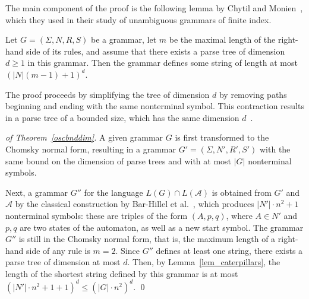 \documentclass[runningheads]{llncs}
\begin{document}
The main component of the proof
is the following lemma by Chytil and Monien~\cite{ChytilMonien},
which they used in their study of unambiguous grammars of finite index.

\begin{lemma}\label{lem_caterpillars}
%
Let $G=(\Sigma, N, R, S)$ be a grammar,
let $m$ %
be the maximal length of the right-hand side of its rules,
and assume that there exists a parse tree of dimension $d \geqslant 1$ in this grammar.
Then the grammar defines some string
of length at most $(|N|(m-1) + 1)^d$.
\end{lemma}

The proof proceeds by simplifying the tree of dimension $d$
by removing paths beginning and ending with the same nonterminal symbol.
This contraction results in a parse tree of a bounded size,
which has the same dimension $d$~\cite{ChytilMonien}.

\begin{proof}[of Theorem~\ref{oscbnddim}]
A given grammar $G$ is first transformed to the Chomsky normal form,
resulting in a grammar $G'=(\Sigma, N', R', S')$
with the same bound on the dimension of parse trees
and with at most $|G|$ nonterminal symbols.

Next, a grammar $G''$ for the language $L(G) \cap L(\mathcal{A})$
is obtained from $G'$ and $\mathcal{A}$
by the classical construction by Bar-Hillel et al.~\cite{BarHillel},
which produces $|N'| \cdot n^2 + 1$ nonterminal symbols:
these are triples of the form $(A, p, q)$, where $A \in N'$
and $p,q$ are two states of the automaton,
as well as a new start symbol.
The grammar $G''$ is still in the Chomsky normal form,
that is, the maximum length of a right-hand side of any rule is $m=2$.
Since $G''$ defines at least one string,
there exists a parse tree of dimension at most $d$.
Then, by Lemma~\ref{lem_caterpillars},
the length of the shortest string defined by this grammar
is at most 
$(|N'| \cdot n^2 + 1 + 1)^d \leqslant (|G| \cdot n^2)^d$.
\qed
\end{proof}
\end{document}
